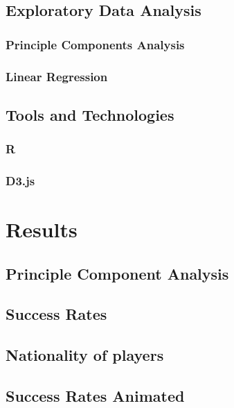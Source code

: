 \documentclass[a4paper,11pt]{article}
\begin{document}
\subsection{Exploratory Data Analysis} %


\subsubsection{Principle Components Analysis}

\subsubsection{Linear Regression}

\subsection{Tools and Technologies} %
\subsubsection{R} %


\subsubsection{D3.js} %

\section{Results}
\subsection{Principle Component Analysis}

\label{sec:PCA}

\subsection{Success Rates}


\subsection{Nationality of players}

\subsection{Success Rates Animated}

\end{document}
